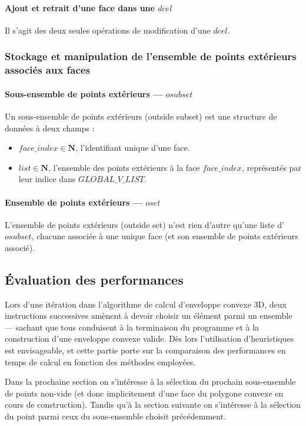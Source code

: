 \documentclass[]{article}
\begin{document}
\paragraph{Ajout et retrait d'une face dans une $dcel$}
Il s'agit des deux seules opérations de modification d'une $dcel$.

\subsubsection{Stockage et manipulation de l'ensemble de points extérieurs associés aux faces}
\paragraph*{Sous-ensemble de points extérieurs — $osubset$}
Un sous-ensemble de points extérieurs (outside subset) est une structure de données à deux champs :
\begin{itemize}
	\item $face\_index \in \mathbf{N}$, l'identifiant unique d'une face.
	\item $list \in \mathbf{N}$, l'ensemble des points extérieurs à la face $face\_index$, représentés par leur indice dans $GLOBAL\_V\_LIST$.
\end{itemize}

\paragraph*{Ensemble de points extérieurs — $oset$}
L'ensemble de points extérieurs (outside set) n'est rien d'autre qu'une liste d'$osubset$, chacune associée à une unique face (et son ensemble de points extérieurs associé).

\subsection{Évaluation des performances}
Lors d'une itération dans l'algorithme de calcul d'enveloppe convexe 3D, deux instructions successives amènent à devoir choisir un élément parmi un ensemble — sachant que tous conduisent à la terminaison du programme et à la construction d'une enveloppe convexe valide. Dès lors l'utilisation d'heuristiques est envisageable, et cette partie porte sur la comparaison des performances en temps de calcul en fonction des méthodes employées.

Dans la prochaine section on s'intéresse à la sélection du prochain sous-ensemble de points non-vide (et donc implicitement d'une face du polygone convexe en cours de construction).
Tandis qu'à la section suivante on s'intéresse à la sélection du point parmi ceux du sous-ensemble choisit précédemment.
\end{document}
